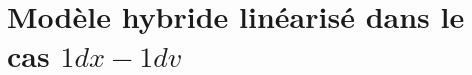 \renewcommand{\localPath}{chap2}

\chapter{Modèle hybride linéarisé dans le cas $1dx-1dv$}










\appsection


